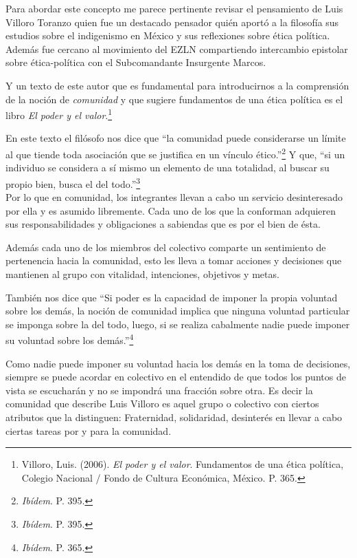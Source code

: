 \documentclass[oneside]{book}
\begin{document}
Para abordar este concepto me parece pertinente revisar el pensamiento de Luis Villoro Toranzo quien fue un destacado pensador quién aportó a la filosofía sus estudios sobre el indigenismo en México y sus reflexiones sobre ética política. Además fue cercano al movimiento del EZLN compartiendo intercambio epistolar sobre ética-política con el Subcomandante Insurgente Marcos.

Y un texto de este autor que es fundamental para introducirnos a la comprensión de la noción de \textit{comunidad} y que sugiere fundamentos de una ética política es el libro \textit{El poder y el valor}.\footnote{Villoro,  Luis. (2006). \textit{El poder y el valor}. Fundamentos de una ética política, Colegio Nacional / Fondo de Cultura Económica, México. P. 365.} 

En este texto el filósofo nos dice que “la comunidad puede considerarse un límite al que tiende toda asociación que se justifica en un vínculo ético.”\footnote{\textit{Ibídem}. P. 395.} Y que, “si un individuo se considera a sí mismo un elemento de una totalidad, al buscar su propio bien, busca el del todo.”\footnote{\textit{Ibídem}. P. 395.} 
\\

Por lo que en comunidad, los integrantes llevan a cabo un servicio desinteresado por ella y es asumido libremente. Cada uno de los que la conforman adquieren sus responsabilidades y obligaciones a sabiendas que es por el bien de ésta.

Además cada uno de los miembros del colectivo comparte un sentimiento de pertenencia hacia la comunidad, esto les lleva a tomar acciones y decisiones que mantienen al grupo con vitalidad, intenciones, objetivos y metas.

También nos dice que “Si poder es la capacidad de imponer la propia voluntad sobre los demás, la noción de comunidad implica que ninguna voluntad particular se imponga sobre la del todo, luego, si se realiza cabalmente nadie puede imponer su voluntad sobre los demás.”\footnote{\textit{Ibídem}. P. 365.}

Como nadie puede imponer su voluntad hacia los demás en la toma de decisiones, siempre se puede acordar en colectivo en el entendido de que todos los puntos de vista se escucharán y no se impondrá una fracción sobre otra. 	Es decir la comunidad que describe Luis Villoro es aquel grupo o colectivo con ciertos atributos que la distinguen: Fraternidad, solidaridad, desinterés en llevar a cabo ciertas tareas por y para la comunidad.  
\end{document}
